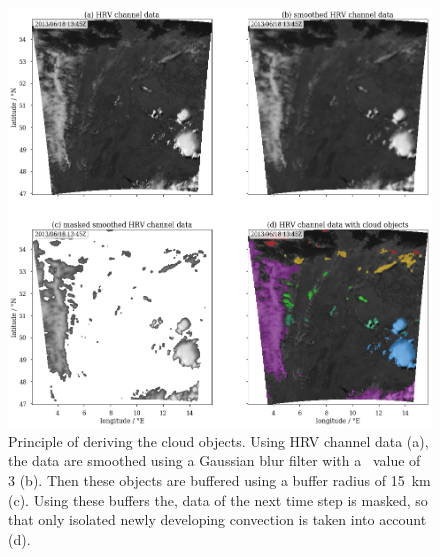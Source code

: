 \begin{figure}[htbp]
\centering
\includegraphics[width=\textwidth]{Grafiken/Abbildungen/wolkenobjektprinzip.png}
\caption{Principle of deriving the cloud objects. Using HRV channel data (a), the data are smoothed using a Gaussian blur filter with a \textsigma~value of 3 (b). Then these objects are buffered using a buffer radius of \SI{15}{\kilo\metre} (c). Using these buffers\add[SL]{,} the\remove[SL]{,}, data of the next time step is masked, so that only isolated newly developing convection is taken into account (d). }
\label{fig:hrv_seg}
\end{figure}

